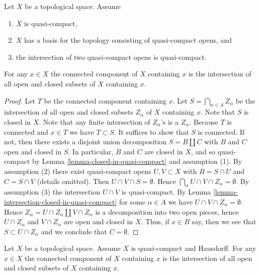 \begin{lemma}
\label{lemma-connected-component-intersection}
Let $X$ be a topological space.
Assume
\begin{enumerate}
\item $X$ is quasi-compact,
\item $X$ has a basis for the topology consisting of quasi-compact opens, and
\item the intersection of two quasi-compact opens is quasi-compact.
\end{enumerate}
For any $x \in X$ the connected component of $X$ containing
$x$ is the intersection of all open and closed subsets
of $X$ containing $x$.
\end{lemma}

\begin{proof}
Let $T$ be the connected component containing $x$.
Let $S = \bigcap_{\alpha \in A} Z_\alpha$ be the intersection of all
open and closed subsets $Z_\alpha$ of $X$ containing $x$.
Note that $S$ is closed in $X$.
Note that any finite intersection of $Z_\alpha$'s is a $Z_\alpha$.
Because $T$ is connected and $x \in T$ we have $T \subset S$.
It suffices to show that $S$ is connected.
If not, then there exists a disjoint union decomposition
$S = B \coprod C$ with $B$ and $C$ open and closed in $S$.
In particular, $B$ and $C$ are closed in $X$, and so quasi-compact by
Lemma \ref{lemma-closed-in-quasi-compact} and assumption (1).
By assumption (2) there exist quasi-compact opens
$U, V \subset X$ with $B = S \cap U$ and $C = S \cap V$ (details omitted).
Then $U \cap V \cap S = \emptyset$.
Hence $\bigcap_\alpha U \cap V \cap Z_\alpha = \emptyset$.
By assumption (3) the intersection $U \cap V$ is quasi-compact.
By Lemma \ref{lemma-intersection-closed-in-quasi-compact}
for some $\alpha \in A$ we have $U \cap V \cap Z_\alpha = \emptyset$.
Hence $Z_\alpha = U \cap Z_\alpha \coprod V \cap Z_\alpha$
is a decomposition into two open pieces,
hence $U \cap Z_\alpha$ and $V \cap Z_\alpha$ are open and closed in $X$.
Thus, if $x \in B$ say, then we see that $S \subset U \cap Z_\alpha$
and we conclude that $C = \emptyset$.
\end{proof}

\begin{lemma}
\label{lemma-connected-component-intersection-compact-Hausdorff}
Let $X$ be a topological space. Assume $X$ is quasi-compact and Hausdorff.
For any $x \in X$ the connected component of $X$ containing
$x$ is the intersection of all open and closed subsets
of $X$ containing $x$.
\end{lemma}

